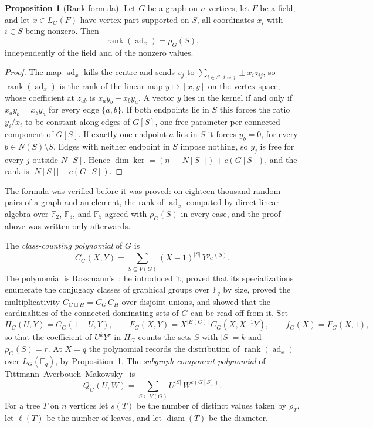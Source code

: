 \documentclass[11pt]{article}
\theoremstyle{definition}
\newcommand{\rank}{\operatorname{rank}}
\newcommand{\Fq}{\mathbb F}
\newtheorem{proposition}{Proposition}
\begin{document}
\begin{proposition}[Rank formula]\label{u:rank}
Let $G$ be a graph on $n$ vertices, let $F$ be a field, and let $x\in L_G(F)$ have vertex part supported on $S$, all coordinates $x_i$ with $i\in S$ being nonzero.  Then
\[
\rank(\operatorname{ad}_x)=\rho_G(S),
\]
independently of the field and of the nonzero values.
\end{proposition}

\begin{proof}
The map $\operatorname{ad}_x$ kills the centre and sends $v_j$ to $\sum_{i\in S,\,i\sim j}\pm x_iz_{ij}$, so $\rank(\operatorname{ad}_x)$ is the rank of the linear map $y\mapsto[x,y]$ on the vertex space, whose coefficient at $z_{ab}$ is $x_ay_b-x_by_a$.  A vector $y$ lies in the kernel if and only if $x_ay_b=x_by_a$ for every edge $\{a,b\}$.  If both endpoints lie in $S$ this forces the ratio $y_i/x_i$ to be constant along edges of $G[S]$, one free parameter per connected component of $G[S]$.  If exactly one endpoint $a$ lies in $S$ it forces $y_b=0$, for every $b\in N(S)\setminus S$.  Edges with neither endpoint in $S$ impose nothing, so $y_j$ is free for every $j$ outside $N[S]$.  Hence $\dim\ker=(n-|N[S]|)+c(G[S])$, and the rank is $|N[S]|-c(G[S])$.
\end{proof}

The formula was verified before it was proved: on eighteen thousand random pairs of a graph and an element, the rank of $\operatorname{ad}_x$ computed by direct linear algebra over $\Fq_2$, $\Fq_3$, and $\Fq_5$ agreed with $\rho_G(S)$ in every case, and the proof above was written only afterwards.

The \emph{class-counting polynomial} of $G$ is
\[
C_G(X,Y)=\sum_{S\subseteq V(G)}(X-1)^{|S|}\,Y^{\rho_G(S)} .
\]
The polynomial is Rossmann's~\cite{Ros22}: he introduced it, proved that its specializations enumerate the conjugacy classes of graphical groups over $\Fq_q$ by size, proved the multiplicativity $C_{G\sqcup H}=C_G\,C_H$ over disjoint unions, and showed that the cardinalities of the connected dominating sets of $G$ can be read off from it.  Set
\[
H_G(U,Y)=C_G(1+U,Y),\qquad
F_G(X,Y)=X^{|E(G)|}\,C_G(X,X^{-1}Y),\qquad
f_G(X)=F_G(X,1),
\]
so that the coefficient of $U^kY^r$ in $H_G$ counts the sets $S$ with $|S|=k$ and $\rho_G(S)=r$.  At $X=q$ the polynomial records the distribution of $\rank(\operatorname{ad}_x)$ over $L_G(\Fq_q)$, by Proposition~\ref{u:rank}.  The \emph{subgraph-component polynomial} of Tittmann--Averbouch--Makowsky~\cite{TAM11} is
\[
Q_G(U,W)=\sum_{S\subseteq V(G)}U^{|S|}\,W^{c(G[S])} .
\]
For a tree $T$ on $n$ vertices let $s(T)$ be the number of distinct values taken by $\rho_T$, let $\ell(T)$ be the number of leaves, and let $\operatorname{diam}(T)$ be the diameter.
\end{document}
